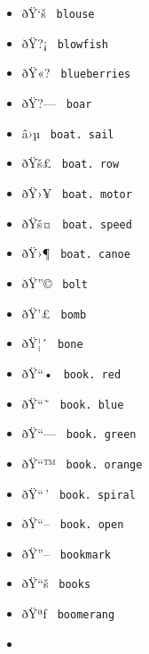 \begin{itemize}
\item
  \label{symbol-blouse}{{ ðŸ`š } \texttt{\ blouse\ }}
\item
  \label{symbol-blowfish}{{ ðŸ?¡ } \texttt{\ blowfish\ }}
\item
  \label{symbol-blueberries}{{ ðŸ«? }
  \texttt{\ blueberries\ }}
\item
  \label{symbol-boar}{{ ðŸ?--- } \texttt{\ boar\ }}
\item
  \label{symbol-boat.sail}{{ â›µ }
  \texttt{\ boat.\ sail\ }}
\item
  \label{symbol-boat.row}{{ ðŸš£ }
  \texttt{\ boat.\ row\ }}
\item
  \label{symbol-boat.motor}{{ ðŸ›¥ }
  \texttt{\ boat.\ motor\ }}
\item
  \label{symbol-boat.speed}{{ ðŸš¤ }
  \texttt{\ boat.\ speed\ }}
\item
  \label{symbol-boat.canoe}{{ ðŸ›¶ }
  \texttt{\ boat.\ canoe\ }}
\item
  \label{symbol-bolt}{{ ðŸ''© } \texttt{\ bolt\ }}
\item
  \label{symbol-bomb}{{ ðŸ'£ } \texttt{\ bomb\ }}
\item
  \label{symbol-bone}{{ ðŸ¦´ } \texttt{\ bone\ }}
\item
  \label{symbol-book.red}{{ ðŸ``• }
  \texttt{\ book.\ red\ }}
\item
  \label{symbol-book.blue}{{ ðŸ``˜ }
  \texttt{\ book.\ blue\ }}
\item
  \label{symbol-book.green}{{ ðŸ``--- }
  \texttt{\ book.\ green\ }}
\item
  \label{symbol-book.orange}{{ ðŸ``™ }
  \texttt{\ book.\ orange\ }}
\item
  \label{symbol-book.spiral}{{ ðŸ``\,' }
  \texttt{\ book.\ spiral\ }}
\item
  \label{symbol-book.open}{{ ðŸ``-- }
  \texttt{\ book.\ open\ }}
\item
  \label{symbol-bookmark}{{ ðŸ''-- }
  \texttt{\ bookmark\ }}
\item
  \label{symbol-books}{{ ðŸ``š } \texttt{\ books\ }}
\item
  \label{symbol-boomerang}{{ ðŸªƒ }
  \texttt{\ boomerang\ }}
\item

\end{itemize}
